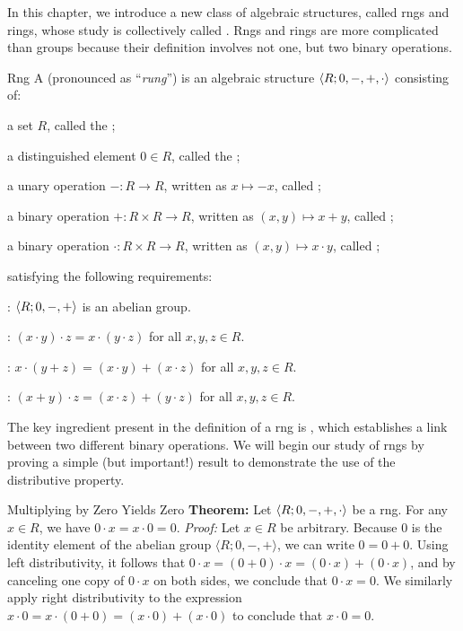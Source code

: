 \documentclass[12pt]{report}
\begin{document}
In this chapter, we introduce a new class of algebraic structures, called rngs and rings, whose study is collectively called . Rngs and rings are more complicated than groups because their definition involves not one, but two binary operations.

\begin{dfnbox}{Rng}
	A  (pronounced as ``\textit{rung}'') is an algebraic structure ${\langle {R; 0, -, +, \cdot} \rangle}$ consisting of:
	\begin{dfnitems}
		\item a set $R$, called the ;
		\item a distinguished element $0 \in R$, called the ;
		\item a unary operation $-: R \to R$, written as $x \mapsto -x$, called ;
		\item a binary operation $+: R \times R \to R$, written as $(x, y) \mapsto x + y$, called ;
		\item a binary operation $\cdot: R \times R \to R$, written as $(x, y) \mapsto x \cdot y$, called ;
	\end{dfnitems}
	satisfying the following requirements:
	\begin{dfnitems}
		\item {}: ${\langle {R; 0, -, +} \rangle}$ is an abelian group.
		\item {}: $(x \cdot y) \cdot z = x \cdot (y \cdot z)$ for all $x, y, z \in R$.
		\item {}: $x \cdot (y + z) = (x \cdot y) + (x \cdot z)$ for all $x, y, z \in R$.
		\item {}: $(x + y) \cdot z = (x \cdot z) + (y \cdot z)$ for all $x, y, z \in R$.
	\end{dfnitems}
\end{dfnbox}

The key ingredient present in the definition of a rng is , which establishes a link between two different binary operations. We will begin our study of rngs by proving a simple (but important!) result to demonstrate the use of the distributive property.

\begin{thmbox}{Multiplying by Zero Yields Zero}
	\textbf{Theorem:} Let ${\langle {R; 0, -, +, \cdot} \rangle}$ be a rng. For any $x \in R$, we have $0 \cdot x = x \cdot 0 = 0$.
\tcblower
	\textit{Proof:} Let $x \in R$ be arbitrary. Because $0$ is the identity element of the abelian group $\langle R; 0, -, + \rangle$, we can write $0 = 0 + 0$. Using left distributivity, it follows that $0 \cdot x = (0 + 0) \cdot x = (0 \cdot x) + (0 \cdot x)$, and by canceling one copy of $0 \cdot x$ on both sides, we conclude that $0 \cdot x = 0$. We similarly apply right distributivity to the expression $x \cdot 0 = x \cdot (0 + 0) = (x \cdot 0) + (x \cdot 0)$ to conclude that $x \cdot 0 = 0$.
\end{thmbox}
\end{document}
